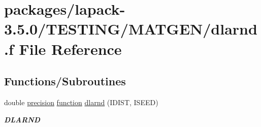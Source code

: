 \hypertarget{dlarnd_8f}{}\section{packages/lapack-\/3.5.0/\+T\+E\+S\+T\+I\+N\+G/\+M\+A\+T\+G\+E\+N/dlarnd.f File Reference}
\label{dlarnd_8f}
\subsection*{Functions/\+Subroutines}
\begin{DoxyCompactItemize}
\item 
double \hyperlink{numinquire_8h_a2c8e616467665d0b2814d4c1589ba74e}{precision} \hyperlink{afunc_8m_a7b5e596df91eadea6c537c0825e894a7}{function} \hyperlink{group__double__matgen_gabd395a0ee27baaacfda74ae5f068e42f}{dlarnd} (I\+D\+I\+S\+T, I\+S\+E\+E\+D)
\begin{DoxyCompactList}\small\item\em {\bfseries D\+L\+A\+R\+N\+D} \end{DoxyCompactList}\end{DoxyCompactItemize}
